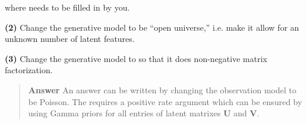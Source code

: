 \documentclass[11pt,reqno]{amsart}
\newif\ifanswers
\newcommand{\+}[1]{\ensuremath{{\mathbf{#1}}}}
\begin{document}
where \inline{<$\cdots$>} needs to be filled in by you.

\ifanswers
\begin{quotation}
 {\bf Answer } 
 \begin{code}{}{}
[assume dot-product (lambda (u v) 
                      (if (= (count u) 0) 0 
                          (+ (* (first u) (first v)) 
                             (dot-product (rest u) (rest v)))))]
[assume repeatedly (lambda (N func)
    (if (= N 0)
        (list)
        (cons (func) (repeatedly (- N 1) func))))]

[assume D 4] ; this is the shared length of rows of U / columns of V 
[assume sigma 0.01]
[assume sigma-U 1]
[assume sigma-V 1]
[assume get-row-U 
    (mem (lambda (m) (repeatedly D (lambda () (normal 0 sigma-U) ))))]
[assume get-col-V 
    (mem (lambda (n) (repeatedly D (lambda () (normal 0 sigma-V) ))))]

[observe-csv "movies.csv" 
     (normal (dot-product (get-row-U $\$$1) (get-col-V $\$$2)) sigma) $\$$3]
[predict  (dot-product (get-row-U 9) (get-col-V 1)) ]
\end{code}
\end{quotation}
\fi

\vspace{1cm}
{\bf (2)} Change the generative model to be ``open universe,'' i.e. make it allow for an unknown number of latent features.

\ifanswers
\begin{quotation}
 {\bf Answer } 
 Change the line
 \begin{code}{}{}
 [assume D 4]
\end{code}
to
 \begin{code}{}{}
 [assume D (poisson 4)]
\end{code}
\end{quotation}
\fi


\vspace{1cm}
{\bf (3)} Change the generative model to so that it does non-negative matrix factorization.

\ifanswers
\begin{quotation}
 {\bf Answer } 
 An answer can be written by changing the observation model to be Poisson.  The requires a positive rate argument which can be ensured by using Gamma priors for all entries of latent matrixes $\mathbf U$ and $\mathbf V$.
 \end{quotation}
\end{document}
